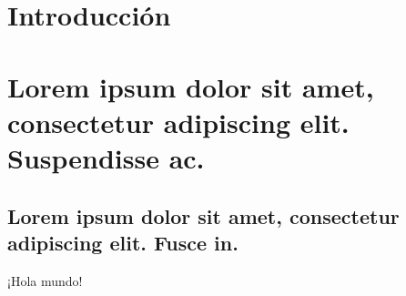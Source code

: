 \documentclass{article}
\begin{document}
\tableofcontents

\section*{Introducción}

\section{Lorem ipsum dolor sit amet, consectetur adipiscing elit. Suspendisse ac.}

\subsection[Fusce in]{Lorem ipsum dolor sit amet, consectetur adipiscing elit. Fusce in.}

¡Hola mundo!
\end{document}
